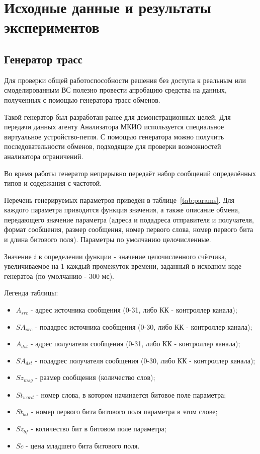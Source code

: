 \section{Исходные данные и результаты экспериментов}
\label{sec:test_listings}

\subsection{Генератор трасс}
\label{subsec:generator}

Для проверки общей работоспособности решения без доступа к реальным 
или смоделированным ВС полезно провести апробацию средства на данных, 
полученных с помощью генератора трасс обменов.

Такой генератор был разработан ранее для демонстрационных целей. Для 
передачи данных агенту Анализатора МКИО используется специальное виртуальное 
устройство-петля. С помощью генератора можно получить последовательности 
обменов, подходящие для проверки возможностей анализатора ограничений.

Во время работы генератор непрерывно передаёт набор сообщений определённых 
типов и содержания с  частотой. 

Перечень генерируемых параметров приведён в таблице~\ref{tab:params}. Для 
каждого параметра приводится функция значения, а также описание 
обмена, передающего значение параметра (адреса и подадреса отправителя и 
получателя, формат сообщения, размер сообщения, номер первого слова, номер 
первого бита и длина битового поля). Параметры по умолчанию целочисленные.

Значение $i$ в определении функции - значение целочисленного счётчика, 
увеличиваемое на 1 каждый промежуток времени, заданный в исходном коде 
генератоа (по умолчанию - 300 мс).

Легенда таблицы:

\begin{itemize}
 \item $A_{src}$ - адрес источника сообщения (0-31, либо КК - контроллер 
канала);
 \item $SA_{src}$ - подадрес источника сообщения (0-30, либо КК - контроллер 
канала);
 \item $A_{dst}$ - адрес получателя сообщения (0-31, либо КК - контроллер 
канала);
 \item $SA_{dst}$ - подадрес получателя сообщения (0-30, либо КК - контроллер 
канала);
 \item $Sz_{msg}$ - размер сообщения (количество слов);
 \item $St_{word}$ - номер слова, в котором начинается битовое поле параметра;
 \item $St_{bit}$ - номер первого бита битового поля параметра в этом слове;
 \item $Sz_{bf}$ - количество бит в битовом поле параметра;
 \item $Sc$ - цена младшего бита битового поля.
\end{itemize}


